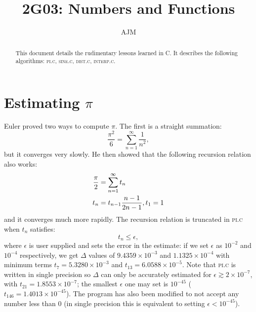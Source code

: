 \documentclass{scrartcl}
\begin{document}
\title{2G03: Numbers and Functions}
\author{AJM}
\maketitle
\begin{abstract}
This document details the rudimentary lessons learned in \textsc{C}.
It describes the following algorithms: \textsc{pi.c}, \textsc{sine.c}, \textsc{dist.c}, \textsc{interp.c}.
\end{abstract}
\section{Estimating $\pi$}
Euler proved two ways to compute $\pi$.
The first is a straight summation:
\begin{equation}
	\frac{\pi^{2}}{6}=\sum_{n=1}^{\infty}{\frac{1}{n^{2}}},
\end{equation}
but it converges very slowly.
He then showed that the following recursion relation also works:
\begin{align}
	\frac{\pi}{2}&=\sum_{n=1}^{\infty}{t_{n}} \\
	t_{n}&=t_{n-1}\frac{n-1}{2n-1}, t_{1}=1\notag
\end{align}
and it converges much more rapidly.
The recursion relation is truncated in \textsc{pi.c} when $t_{n}$ satisfies:
\begin{equation}
	t_{n}\leq\epsilon,
\end{equation}
where $\epsilon$ is user supplied and sets the error in the estimate: if we set $\epsilon$ as $10^{-2}$ and $10^{-4}$ respectively, we get $\Delta$ values of $9.4359\times10^{-3}$ and $1.1325\times10^{-4}$ with minimum terms $t_{7}=5.3280\times10^{-3}$ and $t_{13}=6.0588\times10^{-5}$.
Note that \textsc{pi.c} is written in single precision so $\Delta$ can only be accurately estimated for $\epsilon\gtrsim2\times10^{-7}$, with $t_{21}=1.8553\times10^{-7}$; the smallest $\epsilon$ one may set is $10^{-45}$ ($t_{146}=1.4013\times10^{-45}$).
The program has also been modified to not accept any number less than 0 (in single precision this is equivalent to setting $\epsilon<10^{-45}$).
\end{document}
